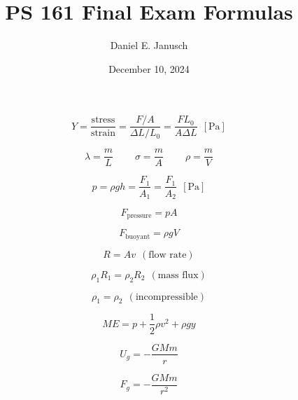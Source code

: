 \documentclass[12pt]{article}
\begin{document}

\title{PS 161 Final Exam Formulas}
\author{Daniel E. Janusch}
\date{December 10, 2024}
\maketitle
\fi

\begin{equation}
	Y = \dfrac{\text{stress}}{\text{strain}} = \dfrac{F/A}{\Delta L/L_0} = \dfrac{F L_0}{A\Delta L}~~[\text{Pa}]
\end{equation}

\begin{equation}
	\lambda = \dfrac mL ~~~~~~~~~~
	\sigma = \dfrac mA ~~~~~~~~~~
	\rho = \dfrac mV
\end{equation}

\begin{equation}
	p = \rho g h = \dfrac{F_1}{A_1} = \dfrac{F_1}{A_2}~~[\text{Pa}]
\end{equation}

\begin{equation}
	F_{\text{pressure}} = p A
\end{equation}

\begin{equation}
	F_{\text{buoyant}} = \rho g V
\end{equation}

\begin{equation}
	R = A v~~(\text{flow rate})
\end{equation}

\begin{equation}
	\rho_1 R_1 = \rho_2 R_2~~(\text{mass flux})
\end{equation}

\begin{equation}
	\rho_1 = \rho_2~~(\text{incompressible})
\end{equation}

\begin{equation}
	M\!E = p + \dfrac 12 \rho v^2 + \rho g y
\end{equation}

\begin{equation}
	U_g = -\dfrac{GMm} r
\end{equation}

\begin{equation}
	F_g = -\dfrac{GMm}{r^2}
\end{equation}
\end{document}
